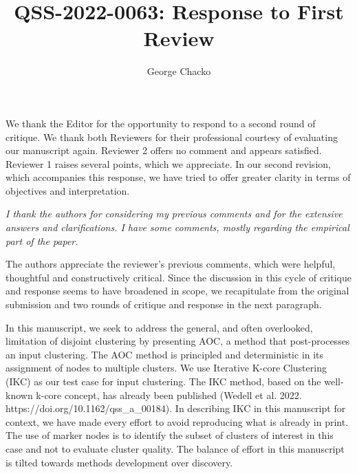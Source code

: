 \documentclass[11pt, oneside]{article}   	%
\title{QSS-2022-0063: Response to First Review}
\author{George Chacko}
\begin{document}
\maketitle
\section*{}

We thank the Editor for the opportunity to respond to a second round of critique. We thank both Reviewers for their professional courtesy of evaluating our manuscript again. Reviewer 2 offers no comment and appears satisfied. Reviewer 1 raises several points, which we appreciate. In our second revision, which accompanies this response, we have tried to offer greater clarity in terms of objectives and interpretation.

 \vspace{2 mm} 
 \emph{I thank the authors for considering my previous comments and for the extensive answers and clarifications. I have some comments, mostly regarding the empirical part of the paper.} 
 
 \vspace{2 mm} 
The authors appreciate  the reviewer's previous comments, which were helpful, thoughtful and constructively critical. Since the discussion in this cycle of critique and response seems to have broadened in scope, we recapitulate from the original submission and two rounds of critique and response in the next paragraph.

 \vspace{2 mm} In this manuscript, we seek to address the general, and often overlooked, limitation of disjoint clustering by presenting AOC, a method that post-processes an input clustering. The AOC method is principled and deterministic in its assignment of nodes to multiple clusters. We use Iterative K-core Clustering (IKC) as our test case for input clustering. The IKC method, based on the well-known k-core concept, has already been published (Wedell et al. 2022. https://doi.org/10.1162/qss\_a\_00184). In describing IKC in this manuscript for context, we have made every effort to avoid reproducing what is already in print. The use of marker nodes is to identify the subset of clusters of interest in this case and not to evaluate cluster quality. The balance of effort in this manuscript is tilted towards methods development over discovery.
 
\end{document}
